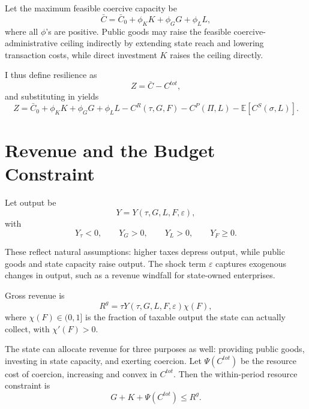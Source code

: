 \documentclass[12pt]{article}
\newcommand{\E}{\mathbb{E}}
\begin{document}
Let the maximum feasible coercive capacity be
\begin{equation}
\bar C = \bar C_0 + \phi_K K + \phi_G G + \phi_L L,
\end{equation}
where all $\phi$'s are positive. Public goods may raise the feasible coercive-administrative ceiling indirectly by extending state reach and lowering transaction costs, while direct investment $K$ raises the ceiling directly.

I thus define resilience as
\begin{equation}
Z = \bar C - C^{tot},
\end{equation}
and substituting in yields
\begin{equation}
Z = \bar C_0 + \phi_K K + \phi_G G + \phi_L L - C^R(\tau,G,F) - C^P(\Pi,L) - \E[C^S(\sigma,L)].
\end{equation}

\section{Revenue and the Budget Constraint}

Let output be
\begin{equation}
Y = Y(\tau,G,L,F,\varepsilon),
\end{equation}
with
\begin{equation}
Y_{\tau} < 0, \qquad Y_G > 0, \qquad Y_L > 0, \qquad Y_F \ge 0.
\end{equation}

These reflect natural assumptions: higher taxes depress output, while public goods and state capacity raise output. The shock term $\varepsilon$ captures exogenous changes in output, such as a revenue windfall for state-owned enterprises.

Gross revenue is
\begin{equation}
R^g = \tau Y(\tau,G,L,F,\varepsilon)\chi(F),
\end{equation}
where $\chi(F) \in (0,1]$ is the fraction of taxable output the state can actually collect, with $\chi'(F)>0$.

The state can allocate revenue for three purposes as well: providing public goods, investing in state capacity, and exerting coercion. Let $\Psi(C^{tot})$ be the resource cost of coercion, increasing and convex in $C^{tot}$. Then the within-period resource constraint is
\begin{equation}
G + K + \Psi(C^{tot}) \le R^g.
\end{equation}
\end{document}
